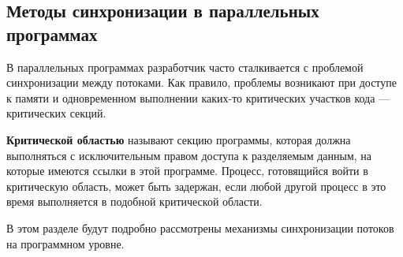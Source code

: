 \subsection{Методы синхронизации в параллельных программах}

В параллельных программах разработчик часто сталкивается с проблемой синхронизации между потоками.
Как правило, проблемы возникают при доступе к памяти и одновременном выполнении каких-то критических участков кода --- критических секций.

\textbf{Критической областью} называют секцию программы, которая должна выполняться с исключительным правом доступа к разделяемым данным, на которые имеются ссылки в этой программе.
Процесс, готовящийся войти в критическую область, может быть задержан, если любой другой процесс в это время выполняется в подобной критической области.

В этом разделе будут подробно рассмотрены механизмы синхронизации потоков на программном уровне.

